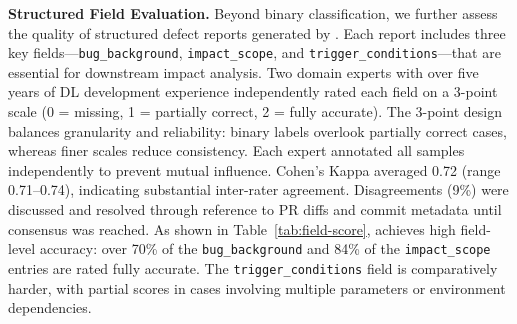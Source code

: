 

\noindent\textbf{Structured Field Evaluation.}
Beyond binary classification, we further assess the quality of structured defect reports generated by \appname.
Each report includes three key fields—\texttt{bug\_background}, \texttt{impact\_scope}, and \texttt{trigger\_conditions}—that are essential for downstream impact analysis.
Two domain experts with over five years of DL development experience independently rated each field on a 3-point scale (0 = missing, 1 = partially correct, 2 = fully accurate).
The 3-point design balances granularity and reliability: binary labels overlook partially correct cases, whereas finer scales reduce consistency.
Each expert annotated all samples independently to prevent mutual influence.
Cohen’s Kappa averaged 0.72 (range 0.71–0.74), indicating substantial inter-rater agreement.
Disagreements (9\%) were discussed and resolved through reference to PR diffs and commit metadata until consensus was reached.
As shown in Table~\ref{tab:field-score}, \appname achieves high field-level accuracy:
over 70\% of the \texttt{bug\_background} and 84\% of the \texttt{impact\_scope} entries are rated fully accurate.
The \texttt{trigger\_conditions} field is comparatively harder, with partial scores in cases involving multiple parameters or environment dependencies.


